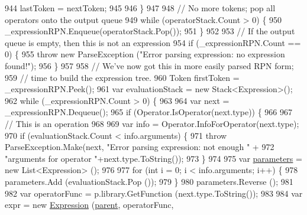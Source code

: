 \begin{DoxyCode}
944                     lastToken = nextToken;
945 
946                 \}
947 
948                 \textcolor{comment}{// No more tokens; pop all operators onto the output queue}
949                 \textcolor{keywordflow}{while} (operatorStack.Count > 0) \{
950                     \_expressionRPN.Enqueue(operatorStack.Pop());
951                 \}
952 
953                 \textcolor{comment}{// If the output queue is empty, then this is not an expression}
954                 \textcolor{keywordflow}{if} (\_expressionRPN.Count == 0) \{
955                     \textcolor{keywordflow}{throw} \textcolor{keyword}{new} ParseException (\textcolor{stringliteral}{"Error parsing expression: no expression found!"});
956                 \}
957 
958                 \textcolor{comment}{// We've now got this in more easily parsed RPN form;}
959                 \textcolor{comment}{// time to build the expression tree.}
960                 Token firstToken = \_expressionRPN.Peek();
961                 var evaluationStack = \textcolor{keyword}{new} Stack<Expression>();
962                 \textcolor{keywordflow}{while} (\_expressionRPN.Count > 0) \{
963 
964                     var next = \_expressionRPN.Dequeue();
965                     \textcolor{keywordflow}{if} (Operator.IsOperator(next.type)) \{
966 
967                         \textcolor{comment}{// This is an operation}
968 
969                         var info = Operator.InfoForOperator(next.type);
970                         \textcolor{keywordflow}{if} (evaluationStack.Count < info.arguments) \{
971                             \textcolor{keywordflow}{throw} ParseException.Make(next, \textcolor{stringliteral}{"Error parsing expression: not enough "} +
972                                 \textcolor{stringliteral}{"arguments for operator "}+next.type.ToString());
973                         \}
974 
975                         var \hyperlink{a00104_a7b21380bead8ae08b2cfc6594edab32c}{parameters} = \textcolor{keyword}{new} List<Expression> ();
976 
977                         \textcolor{keywordflow}{for} (\textcolor{keywordtype}{int} i = 0; i < info.arguments; i++) \{
978                             parameters.Add (evaluationStack.Pop ());
979                         \}
980                         parameters.Reverse ();
981 
982                         var operatorFunc = p.library.GetFunction (next.type.ToString());
983 
984                         var expr = \textcolor{keyword}{new} \hyperlink{a00104_a17e5101d02b96d0071e7a0223e4daa3d}{Expression} (\hyperlink{a00148_af313a82103fcc2ff5a177dbb06b92f7b}{parent}, operatorFunc, 

\end{DoxyCode}
